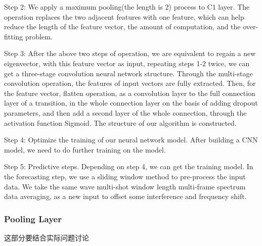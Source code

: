 Step 2: We apply a maximum pooling(the length is 2) process to C1 layer. The operation replaces the two adjacent features with one feature, which can help reduce the length of the feature vector, the amount of computation, and the over-fitting problem.

Step 3: After the above two steps of operation, we are equivalent to regain a new eigenvector, with this feature vector as input, repeating steps 1-2 twice, we can get a three-stage convolution neural network structure. Through the multi-stage convolution operation, the features of input vectors are fully extracted. Then, for the feature vector, flatten operation, as a convolution layer to the full connection layer of a transition, in the whole connection layer on the basis of adding dropout parameters, and then add a second layer of the whole connection, through the activation function Sigmoid. The structure of our algorithm is constructed.

Step 4: Optimize the training of our neural network model. After building a CNN model, we need to do further training on the model.

Step 5: Predictive steps. Depending on step 4, we can get the training model. In the forecasting step, we use a sliding window method to pre-process the input data. We take the same wave multi-shot window length multi-frame spectrum data averaging, as a new input to offset some interference and frequency shift.

\subsubsection{Pooling Layer}

这部分要结合实际问题讨论



